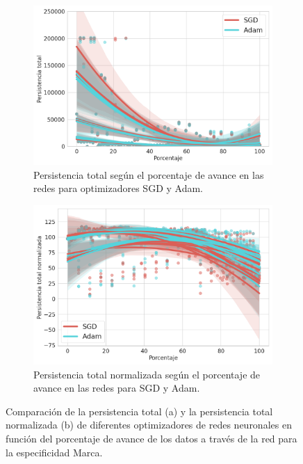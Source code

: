 \begin{figure}[H]
	\centering
	\begin{subfigure}{.5\textwidth}
		\centering
		\includegraphics[width=\linewidth]{img/m_optim.png}
		\caption{Persistencia total según el porcentaje de avance en las redes para optimizadores SGD y Adam.}
		\label{fig:m-homology-optim-1}
	\end{subfigure}%
	\begin{subfigure}{.5\textwidth}
		\centering
		\includegraphics[width=\linewidth]{img/m_optim_norm.png}
		\caption{Persistencia total normalizada según el porcentaje de avance en las redes para SGD y Adam.}
		\label{fig:m-homology-optim-2}
	\end{subfigure}
	\caption{Comparación de la persistencia total (a) y la persistencia total normalizada (b) de diferentes optimizadores de redes neuronales en función del porcentaje de avance de los datos a través de la red para la especificidad Marca.}
	\label{fig:m-homology-optim}
\end{figure}

